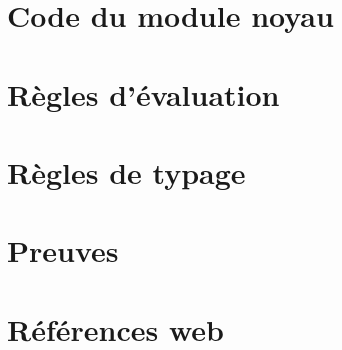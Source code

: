 \documentclass[a4paper,11pt]{memoir}
\begin{document}
\appendix
\renewcommand{\appendixpagename}{Annexes}
\renewcommand{\appendixtocname}{\appendixpagename}
\appendixpage*

\chapter{Code du module noyau}

\label{cha:code-noyau}


\chapter{Règles d'évaluation}



\chapter{Règles de typage}



\chapter{Preuves}



\backmatter


\clearpage

\listoffigures

\clearpage

\renewcommand{\listtheoremname}{Liste des définitions}
\listoftheorems[ignoreall,show={definition}]

\renewcommand{\listtheoremname}{Liste des théorèmes et propriétés}
\listoftheorems[ignoreall,show={theorem,lemma}]

\chapter{Références web}

\insertlinks



\end{document}
